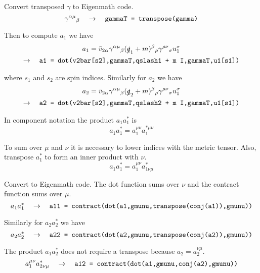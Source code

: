 \documentclass[12pt]{article}
\begin{document}
Convert transposed $\gamma$ to Eigenmath code.
\begin{equation*}
\gamma^{\alpha\mu}{}_\beta
\quad\rightarrow\quad
\text{\tt gammaT = transpose(gamma)}
\end{equation*}

Then to compute $a_1$ we have
\begin{multline*}
a_1=\bar{v}_{2\alpha}\gamma^{\alpha\mu}{}_\beta(\slashed{q}_1+m)^\beta{}_\rho\gamma^{\rho\nu}{}_\sigma u_1^\sigma
\\
\rightarrow\quad
\text{\tt a1 = dot(v2bar[s2],gammaT,qslash1 + m I,gammaT,u1[s1])}
\end{multline*}

where $s_1$ and $s_2$ are spin indices.
Similarly for $a_2$ we have
\begin{multline*}
a_2=\bar{v}_{2\alpha}\gamma^{\alpha\mu}{}_\beta(\slashed{q}_2+m)^\beta{}_\rho\gamma^{\rho\nu}{}_\sigma u_1^\sigma
\\
\rightarrow\quad
\text{\tt a2 = dot(v2bar[s2],gammaT,qslash2 + m I,gammaT,u1[s1])}
\end{multline*}

In component notation the product $a_1a_1^*$ is
\begin{equation*}
a_1a_1^*=a_1^{\mu\nu}a_1^{*\mu\nu}
\end{equation*}

To sum over $\mu$ and $\nu$ it is necessary to lower indices with the metric tensor.
Also, transpose $a_1^*$ to form an inner product with $\nu$.
\begin{equation*}
a_1a_1^*=a_1^{\mu\nu}a_{1\nu\mu}^*
\end{equation*}

Convert to Eigenmath code.
The dot function sums over $\nu$ and the contract function sums over $\mu$.
\begin{equation*}
a_1a_1^*
\quad\rightarrow\quad
\text{\tt a11 = contract(dot(a1,gmunu,transpose(conj(a1)),gmunu))}
\end{equation*}

Similarly for $a_2a_2^*$ we have
\begin{equation*}
a_2a_2^*
\quad\rightarrow\quad
\text{\tt a22 = contract(dot(a2,gmunu,transpose(conj(a2)),gmunu))}
\end{equation*}

The product $a_1a_2^*$ does not require a transpose because $a_2=a_2^{\nu\mu}$.
\begin{equation*}
a_1^{\mu\nu}a_{2\nu\mu}^*
\quad\rightarrow\quad
\text{\tt a12 = contract(dot(a1,gmunu,conj(a2),gmunu))}
\end{equation*}
\end{document}
